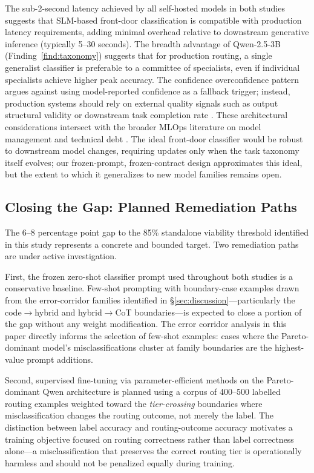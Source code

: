 \documentclass{article}
\begin{document}
The sub-2-second latency achieved by all self-hosted models in both studies suggests that SLM-based front-door classification is compatible with production latency requirements, adding minimal overhead relative to downstream generative inference (typically 5--30 seconds). The breadth advantage of Qwen-2.5-3B (Finding~\ref{find:taxonomy}) suggests that for production routing, a single generalist classifier is preferable to a committee of specialists, even if individual specialists achieve higher peak accuracy. The confidence overconfidence pattern argues against using model-reported confidence as a fallback trigger; instead, production systems should rely on external quality signals such as output structural validity or downstream task completion rate \citep{klaise2021alibi}. These architectural considerations intersect with the broader MLOps literature on model management and technical debt \citep{sculley2015debt,kreuzberger2023mlops}. The ideal front-door classifier would be robust to downstream model changes, requiring updates only when the task taxonomy itself evolves; our frozen-prompt, frozen-contract design approximates this ideal, but the extent to which it generalizes to new model families remains open.

\subsection{Closing the Gap: Planned Remediation Paths}
\label{sec:future}

The 6--8 percentage point gap to the 85\% standalone viability threshold identified in this study represents a concrete and bounded target. Two remediation paths are under active investigation.

First, the frozen zero-shot classifier prompt used throughout both studies is a conservative baseline. Few-shot prompting with boundary-case examples drawn from the error-corridor families identified in \S\ref{sec:discussion}---particularly the code$\to$hybrid and hybrid$\to$CoT boundaries---is expected to close a portion of the gap without any weight modification. The error corridor analysis in this paper directly informs the selection of few-shot examples: cases where the Pareto-dominant model's misclassifications cluster at family boundaries are the highest-value prompt additions.

Second, supervised fine-tuning via parameter-efficient methods \citep{dettmers2023qlora} on the Pareto-dominant Qwen architecture is planned using a corpus of 400--500 labelled routing examples weighted toward the \emph{tier-crossing} boundaries where misclassification changes the routing outcome, not merely the label. The distinction between label accuracy and routing-outcome accuracy motivates a training objective focused on routing correctness rather than label correctness alone---a misclassification that preserves the correct routing tier is operationally harmless and should not be penalized equally during training.
\end{document}
